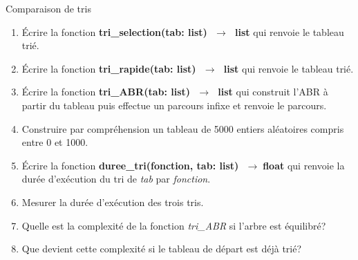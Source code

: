 \documentclass[a4paper,11pt]{article}
\begin{document}
\begin{exo} Comparaison de tris
\begin{enumerate}
    \item Écrire la fonction \textbf{tri\_selection(tab: list) $\;\rightarrow\;$ list} qui renvoie le tableau trié.
    \item Écrire la fonction \textbf{tri\_rapide(tab: list) $\;\rightarrow\;$ list} qui renvoie le tableau trié.
    \item Écrire la fonction \textbf{tri\_ABR(tab: list) $\;\rightarrow\;$ list} qui construit l'ABR à partir du tableau puis effectue un parcours infixe et renvoie le parcours.
    \item Construire par compréhension un tableau de 5000 entiers aléatoires compris entre 0 et 1000.
    \item Écrire la fonction \textbf{duree\_tri(fonction, tab: list) $\;\rightarrow\;$float} qui renvoie la durée d'exécution du tri de \emph{tab} par \emph{fonction}.
    \item Mesurer la durée d'exécution des trois tris.
    \item Quelle est la complexité de la fonction \emph{tri\_ABR} si l'arbre est équilibré?
    \item Que devient cette complexité si le tableau de départ est déjà trié?
\end{enumerate}
\end{exo}
\end{document}
